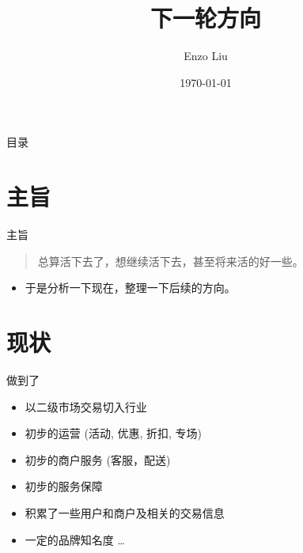 \documentclass[presentation,bigger]{beamer}
\author{Enzo Liu}
\date{\today}
\title{下一轮方向}
\begin{document}
\maketitle
\begin{frame}{目录}
\tableofcontents
\end{frame}



\section{主旨}
\label{sec:org3b823a7}

\begin{frame}[label={sec:org1ca7132}]{主旨}
\begin{quote}
总算活下去了，想继续活下去，甚至将来活的好一些。
\end{quote}

\begin{itemize}
\item 于是分析一下现在，整理一下后续的方向。
\end{itemize}
\end{frame}

\section{现状}
\label{sec:org9f8b48c}

\begin{frame}[label={sec:org08ccc04}]{做到了}
\begin{itemize}
\item 以二级市场交易切入行业
\item 初步的运营 (活动, 优惠, 折扣, 专场)
\item 初步的商户服务 (客服，配送)
\item 初步的服务保障
\item 积累了一些用户和商户及相关的交易信息
\item 一定的品牌知名度 \dots{}
\end{itemize}
\end{frame}
\end{document}
